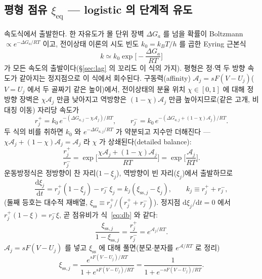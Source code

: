 \documentclass[11pt,a4paper]{article}
\newcommand{\dd}{\mathrm{d}}
\newcommand{\eq}{\mathrm{eq}}
\newcommand{\sstat}{\mathrm{ss}}
\begin{document}
\subsection{평형 점유 $\xi_\eq$ — logistic 의 단계적 유도}
속도식에서 출발한다. 한 자유도가 몰 단위 장벽 $\Delta G_a$ 를 넘을 확률이 Boltzmann
$\propto e^{-\Delta G_a/RT}$ 이고, 전이상태 이론의 시도 빈도 $k_0=k_BT/h$ 를 곱한 Eyring 근본식 \cite{eyring1935}
\begin{equation}
k\simeq k_0\exp\!\Big[-\frac{\Delta G_a}{RT}\Big]
\label{eq:eyring}
\end{equation}
가 모든 속도의 출발이다(\S\ref{sec:lag} 의 꼬리도 이 식의 가지). 평형은 정$\cdot$역 두 방향 속도가 같아지는
정지점으로 이 식에서 회수된다. 구동력(affinity) $\mathcal A_j=sF(V-U_j)$($V=U_j$ 에서 두 골짜기 같은 높이)에서,
전이상태의 분율 위치 $\chi\in[0,1]$ 에 대해 정방향 장벽은 $\chi\mathcal A_j$ 만큼 낮아지고 역방향은
$(1-\chi)\mathcal A_j$ 만큼 높아지므로(같은 고개, 비대칭 이동) 자리당 속도가
\begin{equation}
r_j^+=k_0\,e^{-(\Delta G_{a,j}-\chi\mathcal A_j)/RT},\qquad
r_j^-=k_0\,e^{-(\Delta G_{a,j}+(1-\chi)\mathcal A_j)/RT}.
\label{eq:bv}
\end{equation}
두 식의 비를 취하면 $k_0$ 와 $e^{-\Delta G_{a,j}/RT}$ 가 약분되고 지수만 더해진다 — $\chi\mathcal A_j+(1-\chi)\mathcal A_j=
\mathcal A_j$ 라 $\chi$ 가 상쇄된다(detailed balance):
\begin{equation}
\frac{r_j^+}{r_j^-}
=\exp\!\Big[\frac{\chi\mathcal A_j+(1-\chi)\mathcal A_j}{RT}\Big]
=\exp\!\Big[\frac{\mathcal A_j}{RT}\Big].
\label{eq:db}
\end{equation}
운동방정식은 정방향이 찬 자리($1-\xi_j$), 역방향이 빈 자리($\xi_j$)에서 출발하므로
\begin{equation}
\frac{\dd\xi_j}{\dd t}=r_j^+(1-\xi_j)-r_j^-\,\xi_j=k_j(\xi_{\sstat,j}-\xi_j),
\qquad k_j\equiv r_j^++r_j^-,
\label{eq:relax}
\end{equation}
(둘째 등호는 대수적 재배열, $\xi_\sstat\equiv r_j^+/(r_j^++r_j^-)$). 정지점 $\dd\xi_j/\dd t=0$ 에서 $r_j^+(1-\xi)=r_j^-\xi$,
곧 점유비가 식~\eqref{eq:db} 와 같다:
\begin{equation}
\frac{\xi_{\sstat,j}}{1-\xi_{\sstat,j}}=\frac{r_j^+}{r_j^-}=e^{\mathcal A_j/RT}.
\label{eq:stationary}
\end{equation}
$\mathcal A_j=sF(V-U_j)$ 를 넣고 $\xi_\sstat$ 에 대해 풀면(분모$\cdot$분자를 $e^{\mathcal A/RT}$ 로 정리)
\begin{equation}
\xi_{\sstat,j}=\frac{e^{sF(V-U_j)/RT}}{1+e^{sF(V-U_j)/RT}}
=\frac{1}{1+e^{-sF(V-U_j)/RT}}.
\label{eq:logisticsolve}
\end{equation}
\end{document}
